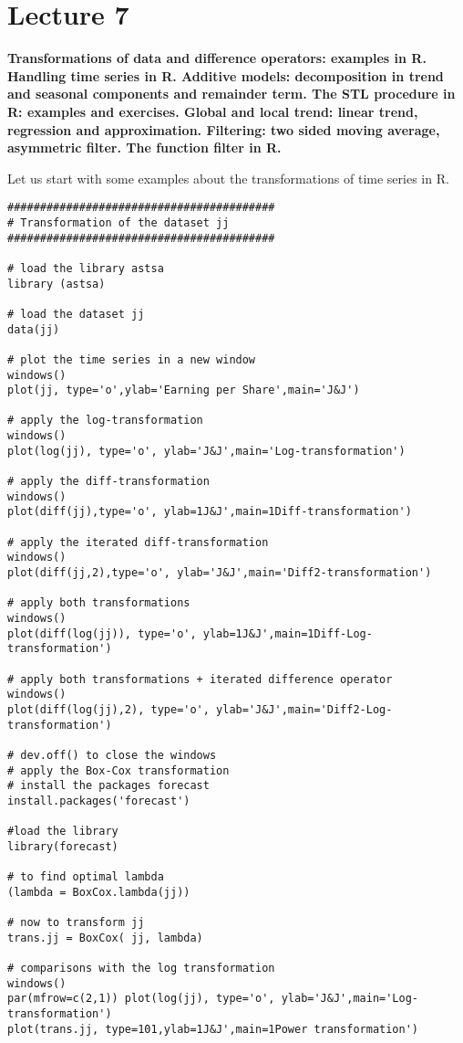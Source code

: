\section{Lecture 7}
\label{lecture7}

\begin{center}
    \textbf{Transformations of data and difference operators: examples in R. Handling time series in R. Additive models: decomposition in trend and seasonal components and remainder term. The STL procedure in R: examples and exercises.  Global and local trend: linear trend, regression and approximation. Filtering: two sided moving average, asymmetric filter. The function filter in R.}
\end{center}

Let us start with some examples about the transformations of time series in R.

\begin{example}
    \begin{verbatim}
######################################### 
# Transformation of the dataset jj 
######################################### 

# load the library astsa 
library (astsa) 

# load the dataset jj
data(jj) 

# plot the time series in a new window 
windows() 
plot(jj, type='o',ylab='Earning per Share',main='J&J') 

# apply the log-transformation 
windows() 
plot(log(jj), type='o', ylab='J&J',main='Log-transformation') 

# apply the diff-transformation 
windows() 
plot(diff(jj),type='o', ylab=1J&J',main=1Diff-transformation') 

# apply the iterated diff-transformation 
windows() 
plot(diff(jj,2),type='o', ylab='J&J',main='Diff2-transformation') 

# apply both transformations 
windows() 
plot(diff(log(jj)), type='o', ylab=1J&J',main=1Diff-Log-transformation') 

# apply both transformations + iterated difference operator 
windows() 
plot(diff(log(jj),2), type='o', ylab='J&J',main='Diff2-Log-transformation') 

# dev.off() to close the windows 
# apply the Box-Cox transformation 
# install the packages forecast 
install.packages('forecast') 

#load the library 
library(forecast) 

# to find optimal lambda 
(lambda = BoxCox.lambda(jj)) 

# now to transform jj 
trans.jj = BoxCox( jj, lambda) 

# comparisons with the log transformation 
windows() 
par(mfrow=c(2,1)) plot(log(jj), type='o', ylab='J&J',main='Log-transformation') 
plot(trans.jj, type=101,ylab=1J&J',main=1Power transformation') 
    \end{verbatim}
\end{example}

